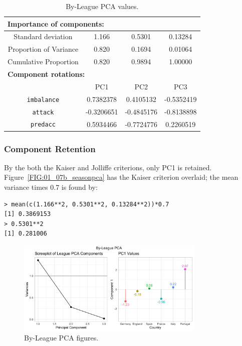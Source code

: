 \documentclass[a4paper,10pt]{report}
\begin{document}
\begin{table}[h!]\begin{center}\begin{tabular}{c|ccc}
\multicolumn{4}{l}{\textbf{Importance of components:}}\\ \hline
Standard deviation     &1.166 &0.5301 &0.13284\\
Proportion of Variance &0.820 &0.1694 &0.01064\\
Cumulative Proportion  &0.820 &0.9894 &1.00000\\\hline\hline
\multicolumn{4}{l}{\textbf{Component rotations:}} \\
						& PC1 & PC2 & PC3  \\\hline
\lstinline|imbalance| & 0.7382378&  0.4105132& -0.5352419\\
\lstinline|attack|    &-0.3206651& -0.4845176& -0.8138898\\
\lstinline|predacc|   & 0.5934466& -0.7724776&  0.2260519\\ \hline\hline

\end{tabular}\end{center}\caption{By-League PCA values.}\label{tab:leaguepcvals}
\end{table}

\subsubsection{Component Retention}
By the both the Kaiser and Jolliffe criterions, only PC1 is retained. Figure~\ref{FIG:01_07b_seasonpca} has the Kaiser criterion overlaid; the mean variance times 0.7 is found by:
\begin{lstlisting}
> mean(c(1.166**2, 0.5301**2, 0.13284**2))*0.7
[1] 0.3869153
> 0.5301**2
[1] 0.281006
\end{lstlisting}

\begin{figure}[h!]\begin{center}
	\includegraphics[width=0.8\textwidth]{elite_07a_leaguepca.png}
	\caption{By-League PCA figures.}\label{FIG:01_07_leaguepca}
\end{center}\end{figure}
\end{document}

